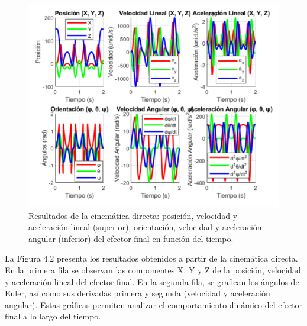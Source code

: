\begin{figure}[H]
	\centering
	\includegraphics[width=0.9\linewidth]{img/imagen2directa}
	\caption{Resultados de la cinemática directa: posición, velocidad y aceleración lineal (superior), orientación, velocidad y aceleración angular (inferior) del efector final en función del tiempo.}
	\label{fig:imagen2directa}
\end{figure}
La Figura 4.2 presenta los resultados obtenidos a partir de la cinemática directa. En la primera fila se observan las componentes X, Y y Z de la posición, velocidad y aceleración lineal del efector final. En la segunda fila, se grafican los ángulos de Euler, así como sus derivadas primera y segunda (velocidad y aceleración angular). Estas gráficas permiten analizar el comportamiento dinámico del efector final a lo largo del tiempo.



